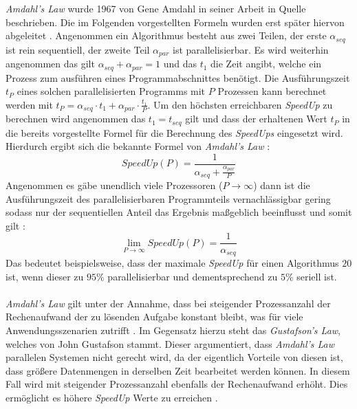 \\\\
\emph{Amdahl's Law} wurde 1967 von Gene Amdahl in seiner Arbeit in Quelle \cite{amdahll1967validity} beschrieben. Die im Folgenden vorgestellten Formeln wurden erst später hiervon abgeleitet \cite{amdahll1967validity}. Angenommen ein Algorithmus besteht aus zwei Teilen, der erste $\alpha_{seq}$ ist rein sequentiell, der zweite Teil $\alpha_{par}$ ist parallelisierbar. Es wird weiterhin angenommen das gilt $\alpha_{seq}+\alpha_{par}=1$ und das $t_1$ die Zeit angibt, welche ein Prozess zum ausführen eines Programmabschnittes benötigt. Die Ausführungszeit $t_P$ eines solchen parallelisierten Programms mit $P$ Prozessen kann berechnet werden mit $t_P=\alpha_{seq} \cdot t_1 + \alpha_{par} \cdot \frac{t_1}{P}$. Um den höchsten erreichbaren \emph{SpeedUp} zu berechnen wird angenommen das $t_1=t_{seq}$ gilt und dass der erhaltenen Wert $t_P$ in die bereits vorgestellte Formel für die Berechnung des \emph{SpeedUps} eingesetzt wird. Hierdurch ergibt sich die bekannte Formel von \emph{Amdahl's Law} \cite{nielsen2016introduction}: 
$$SpeedUp(P)=\frac{1}{\alpha_{seq}+\frac{\alpha_{par}}{P}}$$
Angenommen es gäbe unendlich viele Prozessoren ($P \rightarrow \infty$) dann ist die Ausführungszeit des parallelisierbaren Programmteils vernachlässigbar gering sodass nur der sequentiellen Anteil das Ergebnis maßgeblich beeinflusst und somit gilt \cite{nielsen2016introduction}:
$$\lim _{P \rightarrow \infty} SpeedUp(P)=\frac{1}{\alpha_{seq}}$$
Das bedeutet beispielsweise, dass der maximale \emph{SpeedUp} für einen Algorithmus $20$ ist, wenn dieser zu $95\%$ parallelisierbar und dementsprechend zu $5\%$ seriell ist. 
\\\\ %
\emph{Amdahl's Law} gilt unter der Annahme, dass bei steigender Prozessanzahl der Rechenaufwand der zu lösenden Aufgabe konstant bleibt, was für viele Anwendungsszenarien zutrifft \cite{nielsen2016introduction}. Im Gegensatz hierzu steht das \emph{Gustafson's Law}, welches von John Gustafson stammt. Dieser argumentiert, dass \emph{Amdahl's Law} parallelen Systemen nicht gerecht wird, da der eigentlich Vorteile von diesen ist, dass größere Datenmengen in derselben Zeit bearbeitet werden können. In diesem Fall wird mit steigender Prozessanzahl ebenfalls der Rechenaufwand erhöht. Dies ermöglicht es höhere \emph{SpeedUp} Werte zu erreichen \cite{hill2008amdahl}.




















